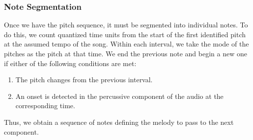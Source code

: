 \subsubsection{Note Segmentation}

Once we have the pitch sequence, it must be segmented into individual notes. To do this, we count quantized time units from the start of the first identified pitch at the assumed tempo of the song. Within each interval, we take the mode of the pitches as the pitch at that time. We end the previous note and begin a new one if either of the following conditions are met:
\begin{enumerate}
    \item The pitch changes from the previous interval.
    \item An onset is detected in the percussive component of the audio at the corresponding time.
\end{enumerate}
Thus, we obtain a sequence of notes defining the melody to pass to the next component.
